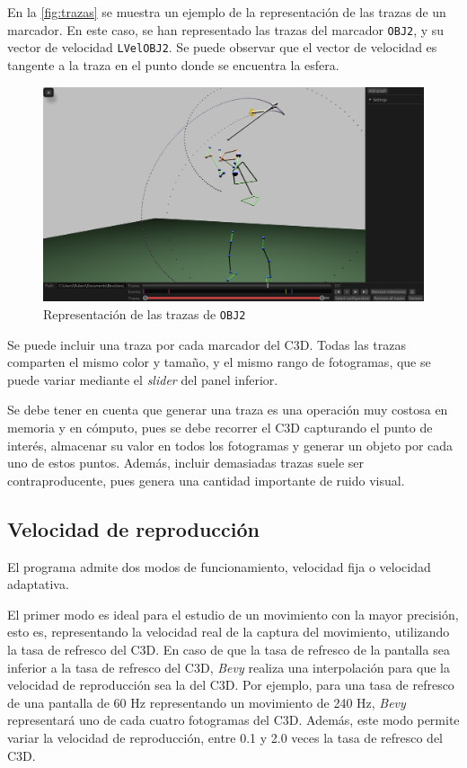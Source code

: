 En la \autoref{fig:trazas} se muestra un ejemplo de la representación de las trazas de un marcador. En este caso, se han representado las trazas del marcador \texttt{OBJ2}, y su vector de velocidad \texttt{LVelOBJ2}. Se puede observar que el vector de velocidad es tangente a la traza en el punto donde se encuentra la esfera.

\begin{figure}[H]
  \centering
  \includegraphics[width=\textwidth]{imagenes/trazas.png}
  \caption{Representación de las trazas de \texttt{OBJ2}}
  \label{fig:trazas}
\end{figure}

Se puede incluir una traza por cada marcador del \ac{C3D}. Todas las trazas comparten el mismo color y tamaño, y el mismo rango de fotogramas, que se puede variar mediante el \textit{slider} del panel inferior. 

Se debe tener en cuenta que generar una traza es una operación muy costosa en memoria y en cómputo, pues se debe recorrer el \ac{C3D} capturando el punto de interés, almacenar su valor en todos los fotogramas y generar un objeto por cada uno de estos puntos. Además, incluir demasiadas trazas suele ser contraproducente, pues genera una cantidad importante de ruido visual.

\subsection{Velocidad de reproducción} \label{sec:modos-reproduccion}

El programa admite dos modos de funcionamiento, velocidad fija o velocidad adaptativa. 

El primer modo es ideal para el estudio de un movimiento con la mayor precisión, esto es, representando la velocidad real de la captura del movimiento, utilizando la tasa de refresco del \ac{C3D}. En caso de que la tasa de refresco de la pantalla sea inferior a la tasa de refresco del \ac{C3D}, \textit{Bevy} realiza una interpolación para que la velocidad de reproducción sea la del \ac{C3D}. Por ejemplo, para una tasa de refresco de una pantalla de 60 \ac{Hz} representando un movimiento de 240 \ac{Hz}, \textit{Bevy} representará uno de cada cuatro fotogramas del \ac{C3D}. Además, este modo permite variar la velocidad de reproducción, entre 0.1 y 2.0 veces la tasa de refresco del \ac{C3D}. 

